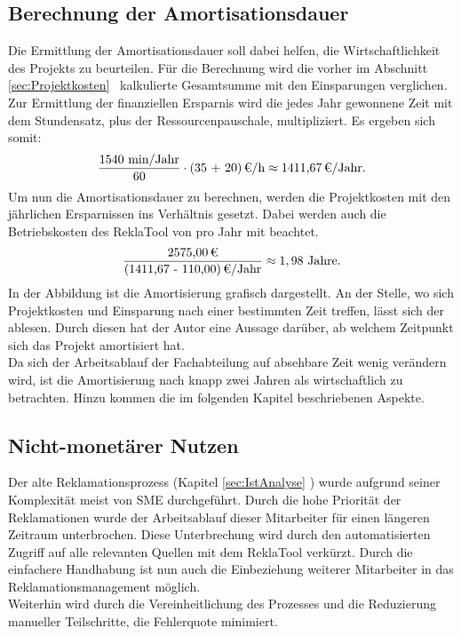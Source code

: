 \subsection*{Berechnung der Amortisationsdauer}
Die Ermittlung der Amortisationsdauer soll dabei helfen, die Wirtschaftlichkeit des Projekts zu beurteilen.
Für die Berechnung wird die vorher im Abschnitt  \ref{sec:Projektkosten}~ kalkulierte Gesamtsumme 
mit den Einsparungen verglichen. 
Zur Ermittlung der finanziellen Ersparnis wird die jedes Jahr gewonnene Zeit mit dem Stundensatz, plus der Ressourcenpauschale,
multipliziert. Es ergeben sich somit:
\begin{eqnarray}
    \frac{1540 \mbox{ min/Jahr}}{60} \cdot \eur{(35 + 20)}\mbox{/h} \approx \eur{1411,67}\mbox{/Jahr}. 
\end{eqnarray}
Um nun die Amortisationsdauer zu berechnen, werden die Projektkosten mit den jährlichen Ersparnissen ins Verhältnis gesetzt.
Dabei werden auch die Betriebskosten des ReklaTool von  pro Jahr mit beachtet.
\begin{eqnarray}
    \frac{\eur{2575,00}}{\eur{(1411,67 - 110,00)}\mbox{/Jahr}} \approx 1,98 \mbox{ Jahre}.	
\end{eqnarray}
In der Abbildung  ist die Amortisierung grafisch dargestellt.
An der Stelle, wo sich Projektkosten und Einsparung nach einer bestimmten Zeit treffen, lässt sich der
 ablesen. Durch diesen hat der Autor eine Aussage darüber, ab welchem Zeitpunkt sich das Projekt amortisiert hat.\\
Da sich der Arbeitsablauf der Fachabteilung auf absehbare Zeit wenig verändern wird, ist die Amortisierung nach knapp zwei
Jahren als wirtschaftlich zu betrachten. Hinzu kommen die im folgenden Kapitel beschriebenen Aspekte.

\subsection{Nicht-monetärer Nutzen}
\label{sec:nichtMonetaererNutzen}
Der alte Reklamationsprozess (\Vgl Kapitel \ref{sec:IstAnalyse} ) wurde aufgrund seiner Komplexität
meist von \ac{SME} durchgeführt. Durch die hohe Priorität der Reklamationen wurde der Arbeitsablauf dieser Mitarbeiter für 
einen längeren Zeitraum unterbrochen. Diese Unterbrechung wird durch den automatisierten Zugriff auf alle relevanten Quellen mit 
dem ReklaTool verkürzt. Durch die einfachere Handhabung ist nun auch die Einbeziehung weiterer Mitarbeiter in das 
Reklamationsmanagement möglich.\\
Weiterhin wird durch die Vereinheitlichung des Prozesses und die Reduzierung manueller Teilschritte, 
die Fehlerquote minimiert. 

